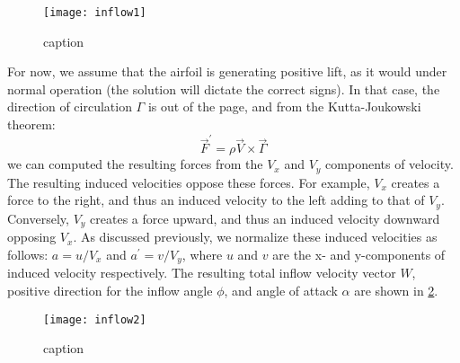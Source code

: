 \begin{figure}[htbp]
\centering
\texttt{[image: inflow1]}
\caption{caption}
\label{fig:inflow1}
\end{figure}

For now, we assume that the airfoil is generating positive lift, as it would under normal operation (the solution will dictate the correct signs).  In that case, the direction of circulation $\Gamma$ is out of the page, and from the Kutta-Joukowski theorem:
\begin{equation}
    \vec{F}^\prime = \rho \vec{V} \times \vec{\Gamma}
\end{equation}
we can computed the resulting forces from the $V_x$ and $V_y$ components of velocity.  The resulting induced velocities oppose these forces.  For example, $V_x$ creates a force to the right, and thus an induced velocity to the left adding to that of $V_y$.  Conversely, $V_y$ creates a force upward, and thus an induced velocity downward opposing $V_x$.  As discussed previously, we normalize these induced velocities as follows: $a = u/V_x$ and $a^\prime = v/V_y$, where $u$ and $v$ are the x- and y-components of induced velocity respectively.  The resulting total inflow velocity vector $W$, positive direction for the inflow angle $\phi$, and angle of attack $\alpha$ are shown in \cref{fig:inflow2}.

\begin{figure}[htbp]
\centering
\texttt{[image: inflow2]}
\caption{caption}
\label{fig:inflow2}
\end{figure}

